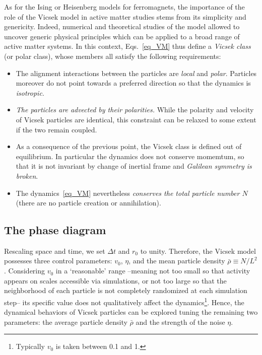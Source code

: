As for the Ising or Heisenberg models for ferromagnets, the importance of the role of the Vicsek model in active matter studies stems from its simplicity and genericity.
Indeed, numerical and theoretical studies of the model allowed to uncover generic physical principles which can be applied to a broad range of active matter systems.
In this context, Eqs.~\eqref{eq_VM} thus define a {\it Vicsek class} (or polar class), whose members all satisfy the following requirements:
\begin{itemize}
\item The alignment interactions between the particles are {\it local} and {\it polar}. 
Particles moreover do not point towards a preferred direction so that the dynamics is {\it isotropic}.  
\item {\it The particles are advected by their polarities.} 
While the polarity and velocity of Vicsek particles are identical, this constraint can be relaxed to some extent if the two remain coupled.
\item As a consequence of the previous point, the Vicsek class is defined out of equilibrium. 
In particular the dynamics does not conserve momemtum, so that it is not invariant by change of inertial frame and {\it Galilean symmetry is broken}.
\item The dynamics~\eqref{eq_VM} nevertheless {\it conserves the total particle number $N$} (there are no particle creation or annihilation).
\end{itemize}

\subsection{The phase diagram}

\label{sec_pd}

Rescaling space and time, we set $\Delta t$ and $r_0$ to unity. 
Therefore, the Vicsek model possesses three control parameters: $v_0$, $\eta$, and the mean particle density $\bar{\rho} \equiv N / L^2$.
Considering $v_0$ in a `reasonable' range --meaning not too small so that activity appears on scales accessible via simulations, 
or not too large so that the neighborhood of each particle is not completely randomized at each simulation step-- its specific value does not qualitatively affect the dynamics\footnote{Typically $v_0$ is taken between 0.1 and 1.}.
Hence, the dynamical behaviors of Vicsek particles can be explored tuning the remaining two parameters: the average particle density $\bar{\rho}$ and the strength of the noise $\eta$.


